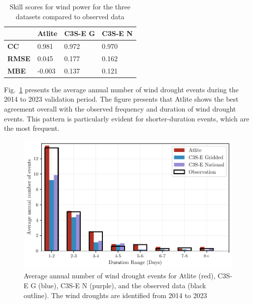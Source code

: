 \documentclass[a4paper, 11p1t]{article}
\begin{document}
\begin{table}[!ht]
	\centering
	\begin{tabular}{l|lll|}
		\cline{2-4}
		& \textbf{Atlite} & \textbf{C3S-E G} & \textbf{C3S-E N} \\ \hline
		\multicolumn{1}{|l|}{\textbf{CC}}   & 0.981           & 0.972            & 0.970            \\ \hline
		\multicolumn{1}{|l|}{\textbf{RMSE}} & 0.045           & 0.177            & 0.162            \\ \hline
		\multicolumn{1}{|l|}{\textbf{MBE}}   & -0.003          & 0.137            & 0.121            \\ \hline
	\end{tabular}
	\caption{Skill scores for wind power for the three datasets compared to observed data}
	\label{tab:wind_skill_scores}
\end{table}

Fig.~\ref{fig:bar_number_events_verification_wind} presents the average annual number of wind drought events during the 2014 to 2023 validation period. The figure presents that Atlite shows the best agreement overall with the observed frequency and duration of wind drought events. This pattern is particularly evident for shorter-duration events, which are the most frequent.

\begin{figure}[!ht]
	\centering
	\includegraphics{verification_wind_number_events.pdf}
	\caption{Average annual number of wind drought events for Atlite (red), C3S-E G (blue), C3S-E N (purple), and the observed data (black outline). The wind droughts are identified from 2014 to 2023}
	\label{fig:bar_number_events_verification_wind}
\end{figure}
\end{document}
